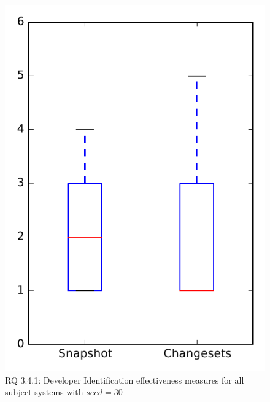 
\begin{figure}
\centering
\includegraphics[height=0.4\textheight]{figures/dit_seed/rq1_overview_30}
\caption{RQ 3.4.1: Developer Identification effectiveness measures for all subject systems with $seed=30$}
\label{fig:dit_seed:rq1:overview}
\end{figure}
